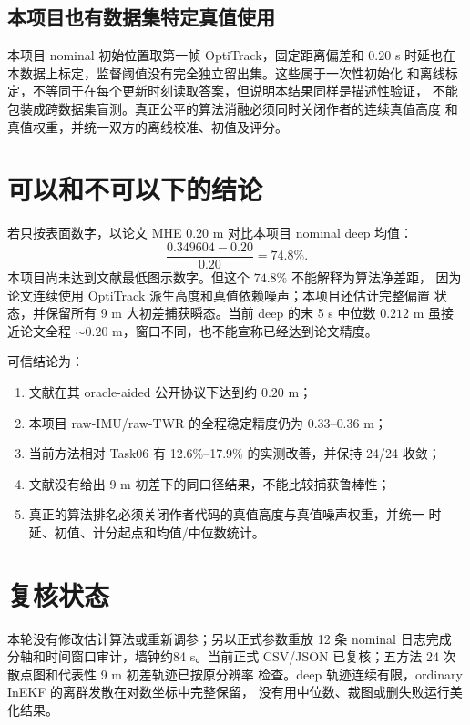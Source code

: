 \documentclass[11pt,a4paper]{ctexart}
\begin{document}
\subsection{本项目也有数据集特定真值使用}

本项目 nominal 初始位置取第一帧 OptiTrack，固定距离偏差和 $0.20$ s
时延也在本数据上标定，监督阈值没有完全独立留出集。这些属于一次性初始化
和离线标定，不等同于在每个更新时刻读取答案，但说明本结果同样是描述性验证，
不能包装成跨数据集盲测。真正公平的算法消融必须同时关闭作者的连续真值高度
和真值权重，并统一双方的离线校准、初值及评分。

\section{可以和不可以下的结论}

若只按表面数字，以论文 MHE $0.20$ m 对比本项目 nominal deep 均值：
\begin{equation}
 \frac{0.349604-0.20}{0.20}=74.8\%.
\end{equation}
本项目尚未达到文献最低图示数字。但这个 $74.8\%$ 不能解释为算法净差距，
因为论文连续使用 OptiTrack 派生高度和真值依赖噪声；本项目还估计完整偏置
状态，并保留所有 9 m 大初差捕获瞬态。当前 deep 的末 5 s 中位数
$0.212$ m 虽接近论文全程 $\sim0.20$ m，窗口不同，也不能宣称已经达到论文精度。

可信结论为：
\begin{enumerate}
 \item 文献在其 oracle-aided 公开协议下达到约 $0.20$ m；
 \item 本项目 raw-IMU/raw-TWR 的全程稳定精度仍为 $0.33$--$0.36$ m；
 \item 当前方法相对 Task06 有 12.6\%--17.9\% 的实测改善，并保持 24/24
       收敛；
 \item 文献没有给出 9 m 初差下的同口径结果，不能比较捕获鲁棒性；
 \item 真正的算法排名必须关闭作者代码的真值高度与真值噪声权重，并统一
       时延、初值、计分起点和均值/中位数统计。
\end{enumerate}

\section{复核状态}

本轮没有修改估计算法或重新调参；另以正式参数重放 12 条 nominal 日志完成
分轴和时间窗口审计，墙钟约84 s。当前正式 CSV/JSON 已复核；五方法
24 次散点图和代表性 9 m 初差轨迹已按原分辨率
检查。deep 轨迹连续有限，ordinary InEKF 的离群发散在对数坐标中完整保留，
没有用中位数、裁图或删失败运行美化结果。
\end{document}
